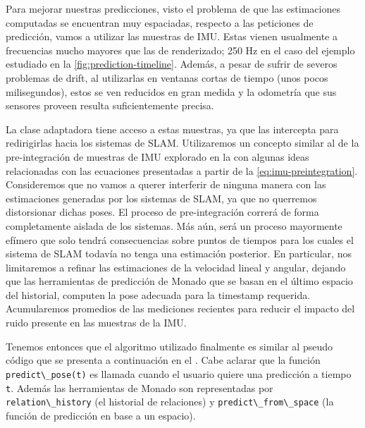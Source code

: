 \documentclass[ twoside,openright,titlepage,numbers=noenddot,%
                headinclude,footinclude,cleardoublepage=empty,abstract=on,
                BCOR=-5mm,paper=a4,fontsize=11pt
                ]{scrreprt}
\newcommand{\passthrough}[1]{#1}
\newcommand{\figref}{\autoref}
\begin{document}
Para mejorar nuestras predicciones, visto el problema de que las
estimaciones computadas se encuentran muy espaciadas, respecto a las
peticiones de predicción, vamos a utilizar las muestras de IMU. Estas
vienen usualmente a frecuencias mucho mayores que las de renderizado;
250 Hz en el caso del ejemplo estudiado en la
\figref{fig:prediction-timeline}. Además, a pesar de sufrir de severos
problemas de drift, al utilizarlas en ventanas cortas de tiempo (unos
pocos milisegundos), estos se ven reducidos en gran medida y la
odometría que sus sensores proveen resulta suficientemente precisa.

La clase adaptadora tiene acceso a estas muestras, ya que las intercepta
para redirigirlas hacia los sistemas de SLAM. Utilizaremos un concepto
similar al de la pre-integración de muestras de IMU explorado en la
 con algunas ideas relacionadas con las
ecuaciones presentadas a partir de la \cref{eq:imu-preintegration}.
Consideremos que no vamos a querer interferir de ninguna manera con las
estimaciones generadas por los sistemas de SLAM, ya que no querremos
distorsionar dichas poses. El proceso de pre-integración correrá de
forma completamente aislada de los sistemas. Más aún, será un proceso
mayormente efímero que solo tendrá consecuencias sobre puntos de tiempos
para los cuales el sistema de SLAM todavía no tenga una estimación
posterior. En particular, nos limitaremos a refinar las estimaciones de
la velocidad lineal y angular, dejando que las herramientas de
predicción de Monado que se basan en el último espacio del historial,
computen la pose adecuada para la timestamp requerida. Acumularemos
promedios de las mediciones recientes para reducir el impacto del ruido
presente en las muestras de la IMU.

Tenemos entonces que el algoritmo utilizado finalmente es similar al
pseudo código que se presenta a continuación en el
. Cabe aclarar que la función
\passthrough{\lstinline!predict\_pose(t)!} es llamada cuando el usuario
quiere una predicción a tiempo \passthrough{\lstinline!t!}. Además las
herramientas de Monado son representadas por
\passthrough{\lstinline!relation\_history!} (el historial de relaciones)
y \passthrough{\lstinline!predict\_from\_space!} (la función de
predicción en base a un espacio).

\clearpage
\end{document}
